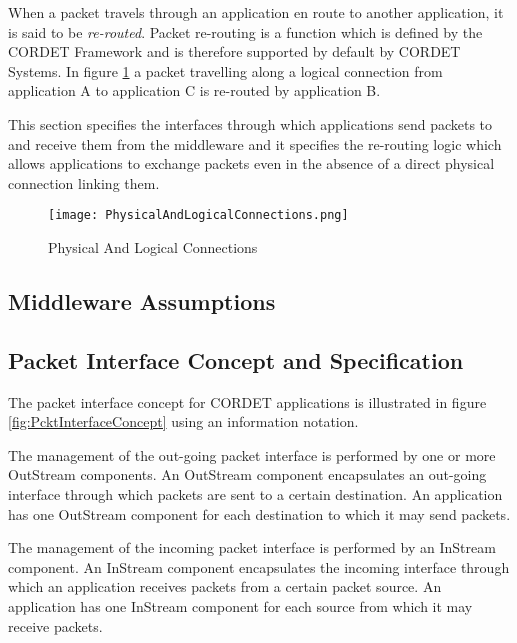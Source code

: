\documentclass{pnp_article}
\begin{document}
When a packet travels through an application en route to another application, it is said to be \textit{re-routed}. Packet re-routing is a function which is defined by the CORDET Framework and is therefore supported by default by CORDET Systems. In figure \ref{fig:PhysicalAndLogicalConnections} a packet travelling along a logical connection from application A to application C is re-routed by application B.

This section specifies the interfaces through which applications send packets to and receive them from the middleware and it specifies the re-routing logic which allows applications to exchange packets even in the absence of a direct physical connection linking them. 

\begin{figure}[ht]
 \centering
 \texttt{[image: PhysicalAndLogicalConnections.png]}
 \caption{Physical And Logical Connections}
 \label{fig:PhysicalAndLogicalConnections}
\end{figure} 

\subsection{Middleware Assumptions}\label{sec:MwAssumptions}
 

\subsection{Packet Interface Concept and Specification}\label{sec:PcktInterfaceConcept}

The packet interface concept for CORDET applications is illustrated in figure \ref{fig:PcktInterfaceConcept} using an information notation.

The management of the out-going packet interface is performed by one or more OutStream components. An OutStream component encapsulates an out-going interface through which packets are sent to a certain destination. An application has one OutStream component for each destination to which it may send packets.

The management of the incoming packet interface is performed by an InStream component. An InStream component encapsulates the incoming interface through which an application receives packets from a certain packet source. An application has one InStream component for each source from which it may receive packets.
\end{document}

